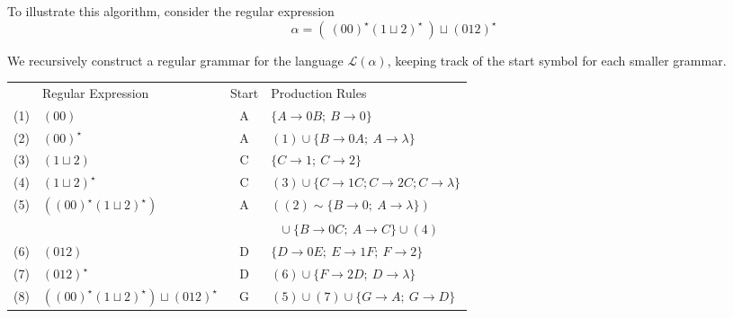 \documentclass{article}
\newcommand{\El}{\mathcal L}
\begin{document}
\begin{description}
  To illustrate this algorithm, consider the regular expression
  \begin{equation*}
  \alpha = (\ (00)^\star (1\sqcup 2)^\star\ ) \sqcup (012)^\star
  \end{equation*}

  We recursively construct a regular grammar for the language $\El(\alpha)$, keeping track of the start symbol for each smaller grammar.
\end{description}

\vspace{0.25cm}

\begin{center}
  \begin{tabular}{clcl}
             &  Regular Expression                               & Start &  Production Rules \\
  \tiny{(1)} &  $(00)$                                           &   A   &  $\{A \to 0B;\ B \to 0\}$ \\
  \tiny{(2)} &  $(00)^\star$                                     &   A   &  $(1)\cup\{B \to 0A;\ A \to \lambda\}$ \\
  \tiny{(3)} &  $(1\sqcup 2)$                                    &   C   &  $\{C \to 1;\ C \to 2\}$ \\
  \tiny{(4)} &  $(1\sqcup 2)^\star$                              &   C   &  $(3)\cup\{C \to 1C; C \to 2C; C \to \lambda\}$\\
  \tiny{(5)} &  $((00)^\star (1\sqcup 2)^\star)$                 &   A   &  $((2)\sim \{B \to 0;\ A \to \lambda\})$ \\
             &                                                   &       &  $\ \ \ \cup \{B \to 0C;\ A \to C\} \cup (4)$ \\
  \tiny{(6)} &  $(012)$                                          &   D   &  $\{D \to 0E;\ E \to 1F;\ F \to 2\}$ \\
  \tiny{(7)} &  $(012)^\star$                                    &   D   &  $(6)\cup\{F \to 2D;\ D \to \lambda\}$ \\
  \tiny{(8)} &  $((00)^\star(1\sqcup2)^\star)\sqcup(012)^\star$  &   G   &  $(5)\cup(7)\cup\{G \to A;\ G \to D\}$ \\
  \end{tabular}
\end{center}

\vspace{0.25cm}
\end{document}
